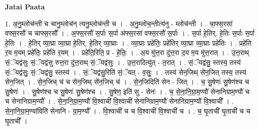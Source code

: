 \documentclass[17pt]{extarticle}
\begin{document}
\textbf{Jatai Paata} \newline

1. अ॒नु॒म्लोच॑न्ती च चानु॒म्लोच॑न् त्यनु॒म्लोच॑न्ती च । . अ॒नु॒म्लोच॒न्तीत्य॑नु - म्लोच॑न्ती । . चा॒फ्स॒रसा॑ वफ्स॒रसौ॑ च चाफ्स॒रसौ᳚ । . अ॒फ्स॒रसौ॑ स॒र्पाः स॒र्पा अ॑फ्स॒रसा॑ वफ्स॒रसौ॑ स॒र्पाः । . स॒र्पा हे॒तिर्. हे॒तिः स॒र्पाः स॒र्पा हे॒तिः । . हे॒तिर् व्या॒घ्रा व्या॒घ्रा हे॒तिर्. हे॒तिर् व्या॒घ्राः । . व्या॒घ्राः प्रहे॑तिः॒ प्रहे॑तिर् व्या॒घ्रा व्या॒घ्राः प्रहे॑तिः । . प्रहे॑ति र॒य म॒यम् प्रहे॑तिः॒ प्रहे॑ति र॒यम् । . प्रहे॑ति॒रिति॒ प्र - हे॒तिः॒ । . अ॒य मु॑त्त॒रा दु॑त्त॒रा द॒य म॒य मु॑त्त॒रात् । . उ॒त्त॒राथ् सं॒ॅयद्व॑सुः सं॒ॅयद्व॑सु रुत्त॒रा दु॑त्त॒राथ् सं॒ॅयद्व॑सुः । . उ॒त्त॒रादित्यु॑त् - त॒रात् । . सं॒ॅयद्व॑सु॒ स्तस्य॒ तस्य॑ सं॒ॅयद्व॑सुः॒ सं॒ॅयद्व॑सु॒ स्तस्य॑ । . सं॒ॅयद्व॑सु॒रिति॑ सं॒ॅयत् - व॒सुः॒ । . तस्य॑ सेन॒जिथ् से॑न॒जित् तस्य॒ तस्य॑ सेन॒जित् । . से॒न॒जिच् च॑ च सेन॒जिथ् से॑न॒जिच् च॑ । . से॒न॒जिदिति॑ सेन - जित् । . च॒ सु॒षेणः॑ सु॒षेण॑श्च च सु॒षेणः॑ । . सु॒षेण॑श्च च सु॒षेणः॑ सु॒षेण॑श्च । . सु॒षेण॒ इति॑ सु - सेनः॑ । . च॒ से॒ना॒नि॒ग्रा॒म॒ण्यौ॑ सेनानिग्राम॒ण्यौ॑ च च सेनानिग्राम॒ण्यौ᳚ । . से॒ना॒नि॒ग्रा॒म॒ण्यौ॑ वि॒श्वाची॑ वि॒श्वाची॑ सेनानिग्राम॒ण्यौ॑ सेनानिग्राम॒ण्यौ॑ वि॒श्वाची᳚ । . से॒ना॒नि॒ग्रा॒म॒ण्या॑विति॑ सेनानि - ग्रा॒म॒ण्यौ᳚ । . वि॒श्वाची॑ च च वि॒श्वाची॑ वि॒श्वाची॑ च । . च॒ घृ॒ताची॑ घृ॒ताची॑ च च घृ॒ताची᳚ । \newline
\end{document}
